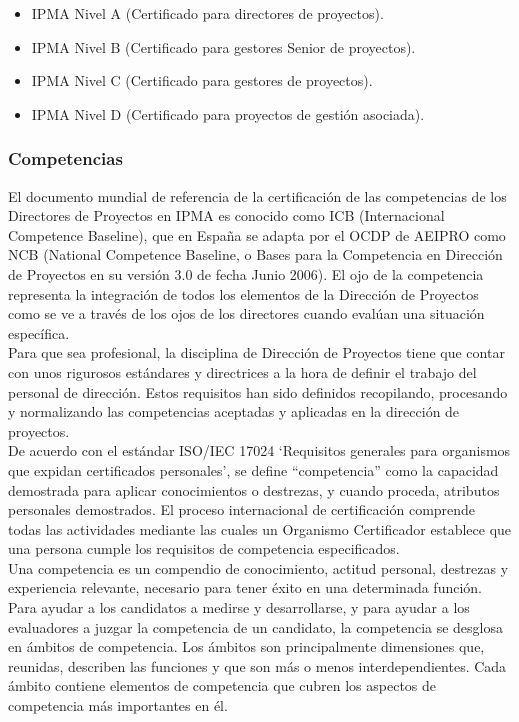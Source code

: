 \begin{itemize}
	\item IPMA Nivel A (Certificado para directores de proyectos).
	\item IPMA Nivel B (Certificado para gestores Senior de proyectos).
	\item IPMA Nivel C (Certificado para gestores de proyectos).
	\item IPMA Nivel D (Certificado para proyectos de gestión asociada).
\end{itemize}

\subsubsection{Competencias}

El documento mundial de referencia de la certificación de las competencias de los Directores de Proyectos en IPMA es conocido como ICB (Internacional Competence Baseline), que en España se adapta por el OCDP de AEIPRO como NCB (National Competence Baseline, o Bases para la Competencia en Dirección de Proyectos en su versión 3.0 de fecha Junio 2006). El ojo de la competencia representa la integración de todos los elementos de la Dirección de Proyectos como se ve a través de los ojos de los directores cuando evalúan una situación específica.\\

Para que sea profesional, la disciplina de Dirección de Proyectos tiene que contar con unos rigurosos estándares y directrices a la hora de definir el trabajo del personal de dirección. Estos requisitos han sido definidos recopilando, procesando y normalizando las competencias aceptadas y aplicadas en la dirección de proyectos.\\

De acuerdo con el estándar ISO/IEC 17024 ‘Requisitos generales para organismos que expidan certificados personales', se define “competencia” como la capacidad demostrada para aplicar conocimientos o destrezas, y cuando proceda, atributos personales demostrados. El proceso internacional de certificación comprende todas las actividades mediante las cuales un Organismo Certificador establece que una persona cumple los requisitos de competencia especificados.\\

Una competencia es un compendio de conocimiento, actitud personal, destrezas y experiencia relevante, necesario para tener éxito en una determinada función. Para ayudar a los candidatos a medirse y desarrollarse, y para ayudar a los evaluadores a juzgar la competencia de un candidato, la competencia se desglosa en ámbitos de competencia. Los ámbitos son principalmente dimensiones que, reunidas, describen las funciones y que son más o menos interdependientes. Cada ámbito contiene elementos de competencia que cubren los aspectos de competencia más importantes en él.\\

